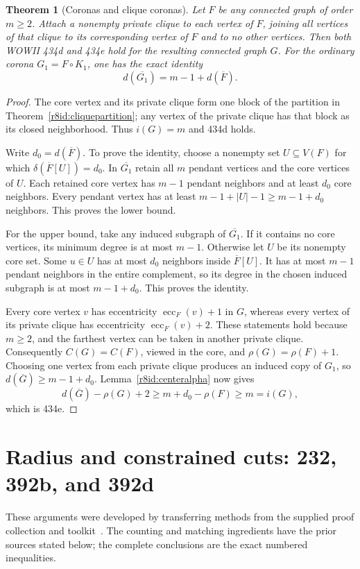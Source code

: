 \documentclass[11pt,a4paper]{article}
\newtheorem{theorem}{Theorem}[section]
\theoremstyle{remark}
\begin{document}
\begin{theorem}[Coronas and clique coronas]
\label{r8id:coronas}
Let $F$ be any connected graph of order $m\ge2$.
Attach a nonempty private clique to each vertex of $F$, joining all
vertices of that clique to its corresponding vertex of $F$ and to no
other vertices. Then both WOWII 434d and 434e hold for the resulting
connected graph $G$.
For the ordinary corona $G_1=F\circ K_1$, one has the exact identity
\[
 d(\overline {G_1})=m-1+d(\overline F).
\]
\end{theorem}
\begin{proof}
The core vertex and its private clique form one block of the partition
in Theorem~\ref{r8id:cliquepartition}; any vertex of the private clique
has that block as its closed neighborhood. Thus $i(G)=m$ and 434d holds.

Write $d_0=d(\overline F)$. To prove the identity, choose a nonempty
set $U\subseteq V(F)$ for which
$\delta(\overline F[U])=d_0$. In $\overline {G_1}$ retain all $m$
pendant vertices and the core vertices of $U$. Each retained core
vertex has $m-1$ pendant neighbors and at least $d_0$ core neighbors.
Every pendant vertex has at least $m-1+|U|-1\ge m-1+d_0$ neighbors.
This proves the lower bound.

For the upper bound, take any induced subgraph of $\overline {G_1}$.
If it contains no core vertices, its minimum degree is at most $m-1$.
Otherwise let $U$ be its nonempty core set. Some $u\in U$ has at most
$d_0$ neighbors inside $\overline F[U]$. It has at most $m-1$
pendant neighbors in the entire complement, so its degree in the
chosen induced subgraph is at most $m-1+d_0$. This proves the identity.

Every core vertex $v$ has eccentricity $\operatorname{ecc}_F(v)+1$
in $G$, whereas every vertex of its private clique has eccentricity
$\operatorname{ecc}_F(v)+2$. These statements hold because $m\ge2$,
and the farthest vertex can be taken in another private clique.
Consequently $C(G)=C(F)$, viewed in the core, and
$\rho(G)=\rho(F)+1$. Choosing one vertex from each private clique
produces an induced copy of $G_1$, so
$d(\overline G)\ge m-1+d_0$. Lemma~\ref{r8id:centeralpha} now gives
\[
 d(\overline G)-\rho(G)+2
 \ge m+d_0-\rho(F)\ge m=i(G),
\]
which is 434e.
\end{proof}


\section{Radius and constrained cuts: 232, 392b, and 392d}
\label{r9:full}
These arguments were developed by transferring methods from the supplied
proof collection and toolkit~\cite{UserProofsR9,UserToolkitR9}. The
counting and matching ingredients have the prior sources stated below;
the complete conclusions are the exact numbered inequalities.
\end{document}

